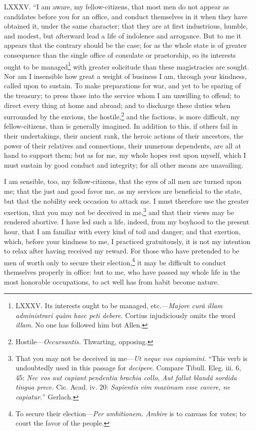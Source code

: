 LXXXV. ``I am aware, my fellow-citizens, that most men do not appear as
candidates before you for an office, and conduct themselves in it when
they have obtained it, under the same character; that they are at
first industrious, humble, and modest, but afterward lead a life of
indolence and arrogance. But to me it appears that the contrary should
be the case; for as the whole state is of greater consequence than the
single office of consulate or praetorship, so its interests ought to
be managed\footnote{LXXXV. Its interests ought to be managed, etc.—\emph{Majore curâ
illam administrari quàm haec peti debere.} Cortius injudiciously
omits the word \emph{illam}. No one has followed him but Allen.} with greater solicitude than these magistracies are
sought. Nor am I insensible how great a weight of business I am,
through your kindness, called upon to sustain. To make preparations
for war, and yet to be sparing of the treasury; to press those into
the service whom I am unwilling to offend; to direct every thing at
home and abroad; and to discharge these duties when surrounded by the
envious, the hostile,\footnote{Hostile—\emph{Occursantis.} Thwarting, opposing.} and the factious, is more difficult, my
fellow-citizens, than is generally imagined. In addition to this, if
others fail in their undertakings, their ancient rank, the heroic
actions of their ancestors, the power of their relatives and
connections, their numerous dependents, are all at hand to support
them; but as for me, my whole hopes rest upon myself, which I must
sustain by good conduct and integrity; for all other means are
unavailing.

I am sensible, too, my fellow-citizens, that the eyes of all men are
turned upon me; that the just and good favor me, as my services are
beneficial to the state, but that the nobility seek occasion to attack
me. I must therefore use the greater exertion, that you may not be
deceived in me,\footnote{That you may not be deceived in me—\emph{Ut neque vos capiamini.}
``This verb is undoubtedly used in this passage for \emph{decipere}.
Compare Tibull. Eleg. iii. 6, 45: \emph{Nec vos aut capiant pendentia
brachia collo, Aut fallat blandâ sordida tingua prece.} Cic. Acad.
iv. 20: \emph{Sapientis vim maximam esse cavere, ne capiatur.}'' Gerlach.} and that their views may be rendered abortive. I
have led such a life, indeed, from my boyhood to the present hour,
that I am familiar with every kind of toil and danger; and that
exertion, which, before your kindness to me, I practiced gratuitously,
it is not my intention to relax after having received my reward. For
those who have pretended to be men of worth only to secure their
election,\footnote{To secure their election—\emph{Per ambitionem. Ambire} is to
canvass for votes; to court the favor of the people.} it may be difficult to conduct themselves properly in
office: but to me, who have passed my whole life in the most honorable
occupations, to act well has from habit become nature.

